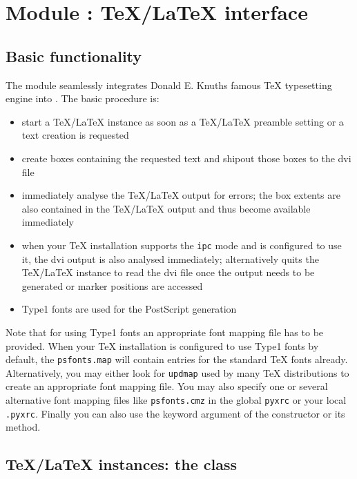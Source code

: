 \chapter{Module : \TeX/\LaTeX{} interface}
\label{module:text}

\section{Basic functionality}

The  module seamlessly integrates Donald E. Knuths famous
\TeX{} typesetting engine into \PyX. The basic procedure is:
\begin{itemize}
\item start a \TeX/\LaTeX{} instance as soon as a \TeX/\LaTeX{}
preamble setting or a text creation is requested
\item create boxes containing the requested text and shipout those
boxes to the dvi file
\item immediately analyse the \TeX/\LaTeX{} output for errors; the box
extents are also contained in the \TeX/\LaTeX{} output and thus become
available immediately
\item when your TeX installation supports the \texttt{ipc} mode and
\PyX{} is configured to use it, the dvi output is also analysed
immediately; alternatively \PyX{} quits the \TeX/\LaTeX{} instance to
read the dvi file once the output needs to be generated or marker
positions are accessed
\item Type1 fonts are used for the PostScript generation
\end{itemize}

Note that for using Type1 fonts an appropriate font mapping file has
to be provided. When your \TeX{} installation is configured to use
Type1 fonts by default, the \texttt{psfonts.map} will contain entries
for the standard \TeX{} fonts already. Alternatively, you may either
look for \texttt{updmap} used by many \TeX{} distributions to create
an appropriate font mapping file. You may also specify one or several
alternative font mapping files like \texttt{psfonts.cmz} in the global
\texttt{pyxrc} or your local \texttt{.pyxrc}. Finally you can also use
the  keyword argument of the 
constructor or its  method.

\section{\TeX/\LaTeX{} instances: the  class}

